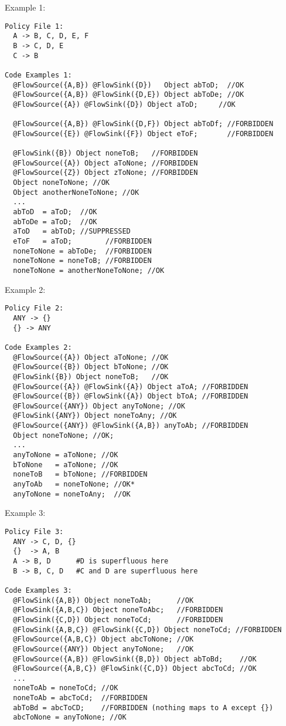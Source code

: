Example 1:
\begin{Verbatim}
Policy File 1:
  A -> B, C, D, E, F
  B -> C, D, E
  C -> B

Code Examples 1:
  @FlowSource({A,B}) @FlowSink({D})   Object abToD;  //OK
  @FlowSource({A,B}) @FlowSink({D,E}) Object abToDe; //OK
  @FlowSource({A}) @FlowSink({D}) Object aToD;     //OK

  @FlowSource({A,B}) @FlowSink({D,F}) Object abToDf; //FORBIDDEN
  @FlowSource({E}) @FlowSink({F}) Object eToF;       //FORBIDDEN

  @FlowSink({B}) Object noneToB;   //FORBIDDEN
  @FlowSource({A}) Object aToNone; //FORBIDDEN
  @FlowSource({Z}) Object zToNone; //FORBIDDEN
  Object noneToNone; //OK
  Object anotherNoneToNone; //OK
  ...
  abToD  = aToD;  //OK
  abToDe = aToD;  //OK
  aToD   = abToD; //SUPPRESSED
  eToF   = aToD;        //FORBIDDEN
  noneToNone = abToDe;  //FORBIDDEN
  noneToNone = noneToB; //FORBIDDEN
  noneToNone = anotherNoneToNone; //OK
\end{Verbatim}

Example 2:
\begin{Verbatim}
Policy File 2:
  ANY -> {}
  {} -> ANY

Code Examples 2:
  @FlowSource({A}) Object aToNone; //OK
  @FlowSource({B}) Object bToNone; //OK
  @FlowSink({B}) Object noneToB;   //OK
  @FlowSource({A}) @FlowSink({A}) Object aToA; //FORBIDDEN
  @FlowSource({B}) @FlowSink({A}) Object bToA; //FORBIDDEN
  @FlowSource({ANY}) Object anyToNone; //OK
  @FlowSink({ANY}) Object noneToAny; //OK
  @FlowSource({ANY}) @FlowSink({A,B}) anyToAb; //FORBIDDEN
  Object noneToNone; //OK;
  ...
  anyToNone = aToNone; //OK
  bToNone   = aToNone; //OK
  noneToB   = bToNone; //FORBIDDEN
  anyToAb   = noneToNone; //OK*
  anyToNone = noneToAny;  //OK
\end{Verbatim}

Example 3:
\begin{Verbatim}
Policy File 3:
  ANY -> C, D, {}
  {}  -> A, B
  A -> B, D      #D is superfluous here
  B -> B, C, D   #C and D are superfluous here

Code Examples 3:
  @FlowSink({A,B}) Object noneToAb;      //OK
  @FlowSink({A,B,C}) Object noneToAbc;   //FORBIDDEN
  @FlowSink({C,D}) Object noneToCd;      //FORBIDDEN
  @FlowSink({A,B,C}) @FlowSink({C,D}) Object noneToCd; //FORBIDDEN
  @FlowSource({A,B,C}) Object abcToNone; //OK
  @FlowSource({ANY}) Object anyToNone;   //OK
  @FlowSource({A,B}) @FlowSink({B,D}) Object abToBd;    //OK
  @FlowSource({A,B,C}) @FlowSink({C,D}) Object abcToCd; //OK
  ...
  noneToAb = noneToCd; //OK
  noneToAb = abcToCd;  //FORBIDDEN
  abToBd = abcToCD;    //FORBIDDEN (nothing maps to A except {})
  abcToNone = anyToNone; //OK
\end{Verbatim}

